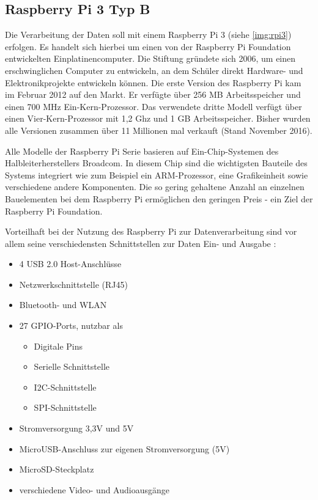 \documentclass[a4paper,12pt,bibliography=totoc, listof=totoc,titlepage,pointlessnumbers]{scrreprt}
\begin{document}
\subsection{Rasp\-berry Pi 3 Typ B}
\label{ss:Raspberry}
Die Verarbeitung der Daten soll mit einem Rasp\-berry Pi 3 (siehe \autoref{img:rpi3}) erfolgen. Es handelt sich hierbei um einen von der Rasp\-berry Pi Foundation entwickelten Einplatinencomputer. Die Stiftung gründete sich 2006, um einen erschwinglichen Computer zu entwickeln, an dem Schüler direkt Hardware- und Elektronikprojekte entwickeln können. Die erste Version des Rasp\-berry Pi kam im Februar 2012 auf den Markt. Er verfügte über 256 MB Arbeitsspeicher und einen 700 MHz Ein-Kern-Prozessor. Das verwendete dritte Modell verfügt über einen Vier-Kern-Prozessor mit 1,2 Ghz und 1 GB Arbeitsspeicher. Bisher wurden alle Versionen zusammen über 11 Millionen mal verkauft (Stand November 2016). \citep{heise5Rasp}

Alle Modelle der Rasp\-berry Pi Serie basieren auf Ein-Chip-Systemen des Halbleiterherstellers Broadcom. In diesem Chip sind die wichtigsten Bauteile des Systems integriert wie zum Beispiel ein ARM-Prozessor, eine Grafikeinheit sowie verschiedene andere Komponenten. Die so gering gehaltene Anzahl an einzelnen Bauelementen bei dem Rasp\-berry Pi ermöglichen den geringen Preis - ein Ziel der Rasp\-berry Pi Foundation. 

Vorteilhaft bei der Nutzung des Rasp\-berry Pi zur Datenverarbeitung sind vor allem seine verschiedensten Schnittstellen zur Daten Ein- und Ausgabe \citep{raspSheet}:
\begin{itemize}
 \item 4 USB 2.0 Host-Anschlüsse
 \item Netzwerkschnittstelle (RJ45)
 \item Bluetooth- und WLAN
 \item 27 GPIO-Ports, nutzbar als \citep{ekRaspPin}
 \begin{itemize} 
  \item Digitale Pins
  \item Serielle Schnittstelle
  \item I2C-Schnittstelle
  \item SPI-Schnittstelle
 \end{itemize}
 \item Stromversorgung 3,3V und 5V
 \item MicroUSB-Anschluss zur eigenen Stromversorgung (5V)
 \item MicroSD-Steckplatz 
 \item verschiedene Video- und Audioausgänge
 \end{itemize}
\end{document}
